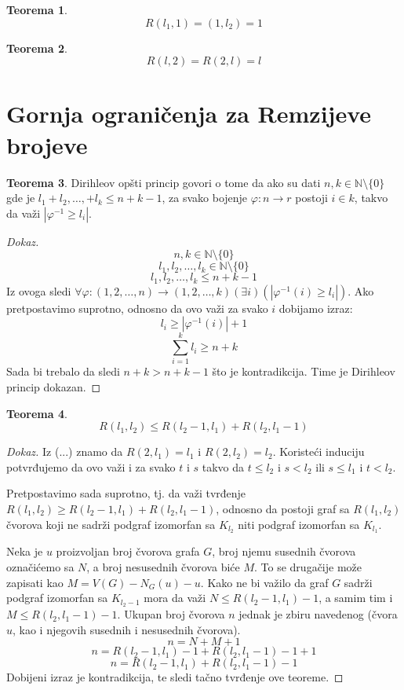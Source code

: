 \documentclass{article}
\theoremstyle{definition}
\newtheorem{teorema}{Teorema}[section]
\newcommand{\dokaz}[1]{\begin{proof}[Dokaz]#1\end{proof}}
\begin{document}
	
	



	\begin{teorema}
	\[
	R(l_1,1)= (1,l_2) = 1
	\]
	\end{teorema}
	\begin{teorema}
	\[
	R(l,2)=R(2,l)=l
	\]
	\end{teorema}

		\newpage
		\section{Gornja ograničenja za Remzijeve brojeve}
		
		\begin{teorema}
Dirihleov opšti princip govori o tome da ako su dati $n,k \in \mathbb{N} \setminus \{0\}$ gde je $l_1+ l_2, \ldots , + l_k \leq n+k-1$, za svako bojenje $\varphi : n \rightarrow r$ postoji $i \in k$, takvo da važi $|\varphi^{-1} \geq l_i|$.
\end{teorema}
\dokaz{
\[
 n,k \in \mathbb{N} \setminus \{0\}
\]
\[
l_1, l_2,\ldots , l_k \in \mathbb{N} \setminus \{0\}
\]
\[
l_1, l_2, \ldots , l_k \leq n+k-1
\]
Iz ovoga sledi $ \forall \varphi : (1,2,\ldots,n) \rightarrow (1,2,\ldots, k)(\exists i)(| \varphi^{-1}(i) \geq l_i|) $. Ako pretpostavimo suprotno, odnosno da ovo važi za svako $i$ dobijamo izraz:
\[
l_i \geq |\varphi^{-1}(i)|+1
\]
\[
 \sum\limits_{i=1}^{k} l_i \geq n+k
\]
Sada bi trebalo da sledi $n+k > n+k-1$ što je kontradikcija. Time je Dirihleov princip dokazan.
}
		
		

	\begin{teorema}
	\[
	R(l_1,l_2) \leq R(l_2-1, l_1) + R(l_2, l_1-1)
	\]
	\end{teorema}
	\dokaz{
	Iz (...) znamo da $R(2,l_1)=l_1$ i $R(2,l_2)=l_2$. Koristeći induciju potvrđujemo da ovo važi i za svako $t$ i $s$ takvo da $t\leq l_2$ i $s<l_2$ ili $s\leq l_1$ i $t<l_2$.

	Pretpostavimo sada suprotno, tj. da važi tvrđenje $R(l_1,l_2) \geq R(l_2-1, l_1) + R(l_2, l_1-1)$, odnosno da postoji graf sa $R(l_1,l_2)$ čvorova koji ne sadrži podgraf izomorfan sa $K_{l_2}$ niti podgraf izomorfan sa $K_{l_1}$.
	

	Neka je $u$ proizvoljan broj čvorova grafa $G$, broj njemu susednih čvorova označićemo sa $N$, a broj nesusednih čvorova biće $M$.
	To se drugačije može zapisati kao $M=V(G)-N_G(u)-{u}$.
	Kako ne bi važilo da graf $G$ sadrži podgraf izomorfan sa $K_{l_2-1}$  mora da važi $N\leq R(l_2-1, l_1)-1 $, a samim tim i $M \leq R(l_2, l_1-1)-1 $. 
	Ukupan broj čvorova $n$ jednak je zbiru navedenog (čvora $u$, kao i njegovih susednih i nesusednih čvorova).
	\[
	n= N+M+1
	\]
	\[
	n= R(l_2-1, l_1)-1 + R(l_2, l_1-1)-1+1
	\]
	\[
	n= R(l_2-1, l_1)+ R(l_2, l_1-1)-1
	\]
	Dobijeni izraz je kontradikcija, te sledi tačno tvrđenje ove teoreme.
	}
	
\end{document}
